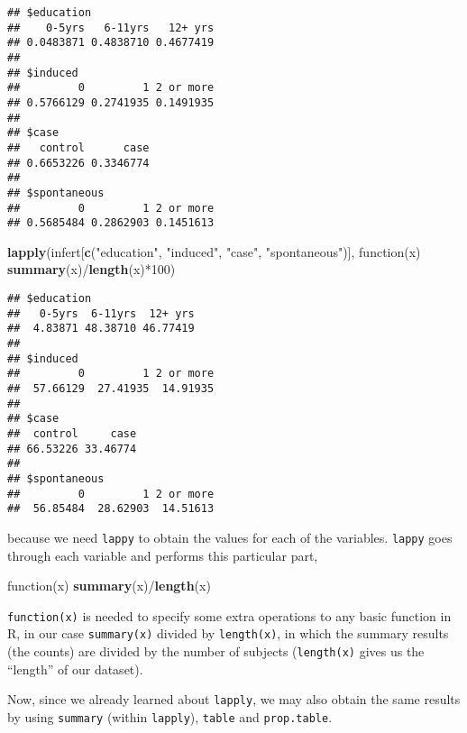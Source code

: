 \documentclass[]{book}
\newenvironment{Shaded}{\begin{snugshade}}{\end{snugshade}}
\newcommand{\KeywordTok}[1]{\textcolor[rgb]{0.13,0.29,0.53}{\textbf{{#1}}}}
\newcommand{\DecValTok}[1]{\textcolor[rgb]{0.00,0.00,0.81}{{#1}}}
\newcommand{\StringTok}[1]{\textcolor[rgb]{0.31,0.60,0.02}{{#1}}}
\newcommand{\NormalTok}[1]{{#1}}
\theoremstyle{definition}
\theoremstyle{definition}
\theoremstyle{remark}
\begin{document}
\begin{verbatim}
## $education
##    0-5yrs   6-11yrs   12+ yrs 
## 0.0483871 0.4838710 0.4677419 
## 
## $induced
##         0         1 2 or more 
## 0.5766129 0.2741935 0.1491935 
## 
## $case
##   control      case 
## 0.6653226 0.3346774 
## 
## $spontaneous
##         0         1 2 or more 
## 0.5685484 0.2862903 0.1451613
\end{verbatim}

\begin{Shaded}
\begin{Highlighting}[]
\KeywordTok{lapply}\NormalTok{(infert[}\KeywordTok{c}\NormalTok{(}\StringTok{"education"}\NormalTok{, }\StringTok{"induced"}\NormalTok{, }\StringTok{"case"}\NormalTok{, }\StringTok{"spontaneous"}\NormalTok{)], }
       \NormalTok{function(x) }\KeywordTok{summary}\NormalTok{(x)/}\KeywordTok{length}\NormalTok{(x)*}\DecValTok{100}\NormalTok{)}
\end{Highlighting}
\end{Shaded}

\begin{verbatim}
## $education
##   0-5yrs  6-11yrs  12+ yrs 
##  4.83871 48.38710 46.77419 
## 
## $induced
##         0         1 2 or more 
##  57.66129  27.41935  14.91935 
## 
## $case
##  control     case 
## 66.53226 33.46774 
## 
## $spontaneous
##         0         1 2 or more 
##  56.85484  28.62903  14.51613
\end{verbatim}

because we need \texttt{lappy} to obtain the values for each of the
variables. \texttt{lappy} goes through each variable and performs this
particular part,

\begin{Shaded}
\begin{Highlighting}[]
\NormalTok{function(x) }\KeywordTok{summary}\NormalTok{(x)/}\KeywordTok{length}\NormalTok{(x)}
\end{Highlighting}
\end{Shaded}

\texttt{function(x)} is needed to specify some extra operations to any
basic function in R, in our case \texttt{summary(x)} divided by
\texttt{length(x)}, in which the summary results (the counts) are
divided by the number of subjects (\texttt{length(x)} gives us the
``length'' of our dataset).

Now, since we already learned about \texttt{lapply}, we may also obtain
the same results by using \texttt{summary} (within \texttt{lapply}),
\texttt{table} and \texttt{prop.table}.
\end{document}
